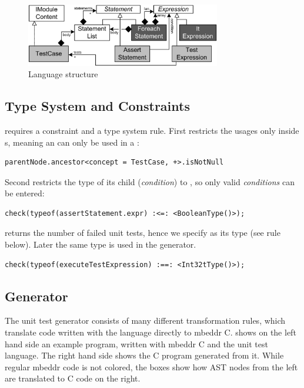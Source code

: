 \begin{figure}[h]
  \vspace{-2mm}
  \centering
    \includegraphics[width=8.5cm]{./figures/umldiag.png} 
    \vspace{-2mm}
    \caption{Language structure}
  \label{fig:UnitTestStructure}
  \vspace{-2mm}
\end{figure}

\subsection{Type System and Constraints}

 requires a constraint and a type
system rule. First restricts the usages only inside s, meaning an
 can only be used in a :
\begin{lstlisting}[language=constraintsAndTS,frame=single]
parentNode.ancestor<concept = TestCase, +>.isNotNull
\end{lstlisting}

Second restricts the type of its child  (\emph{condition}) to
, so only valid \emph{conditions} can be entered:
\begin{lstlisting}[language=constraintsAndTS,frame=single]
check(typeof(assertStatement.expr) :<=: <BooleanType()>);
\end{lstlisting}

 returns the number of failed unit tests,  
hence we specify  as its type (see rule below). Later the same
type is used in the generator.

\begin{lstlisting}[language=constraintsAndTS,frame=single]
check(typeof(executeTestExpression) :==: <Int32tType()>);
\end{lstlisting}


\subsection{Generator}

The unit test generator consists of many different transformation rules, which translate  
code written with the language directly to mbeddr C.  shows
on the left hand side an example program, written with mbeddr C and the unit
test language. The right hand side shows the C program generated from it. While
regular mbeddr code is not colored, the boxes show how \ac{AST} nodes from the
left are translated to C code on the right.

